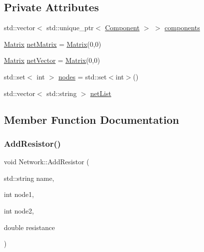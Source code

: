 \subsection*{Private Attributes}
\begin{DoxyCompactItemize}
\item 
std\+::vector$<$ std\+::unique\+\_\+ptr$<$ \hyperlink{classComponent}{Component} $>$ $>$ \hyperlink{classNetwork_a4ee230b842728a61f416cb5a64c5dfb9}{components}
\item 
\hyperlink{classMatrix}{Matrix} \hyperlink{classNetwork_ab23ee0b8d12c2002ab3f21fce276ebb6}{net\+Matrix} = \hyperlink{classMatrix}{Matrix}(0,0)
\item 
\hyperlink{classMatrix}{Matrix} \hyperlink{classNetwork_a93b7a4e3182a75be5181d2f909235654}{net\+Vector} = \hyperlink{classMatrix}{Matrix}(0,0)
\item 
std\+::set$<$ int $>$ \hyperlink{classNetwork_a0e6aeccbefae639a173ebf2d759b34e0}{nodes} = std\+::set$<$int$>$()
\item 
std\+::vector$<$ std\+::string $>$ \hyperlink{classNetwork_aa053af925f59bade9a3aff425c232273}{net\+List}
\end{DoxyCompactItemize}


\subsection{Member Function Documentation}
\mbox{\label{classNetwork_a110bd81c8a0ace8eca270ffd12cff58a}} 
\subsubsection{\texorpdfstring{Add\+Resistor()}{AddResistor()}}
{\footnotesize\ttfamily void Network\+::\+Add\+Resistor (\begin{DoxyParamCaption}\item[{std\+::string}]{name,  }\item[{int}]{node1,  }\item[{int}]{node2,  }\item[{double}]{resistance }\end{DoxyParamCaption})}

\mbox{\label{classNetwork_a28d48c202d27f3f319ef1a837ab05974}} 
